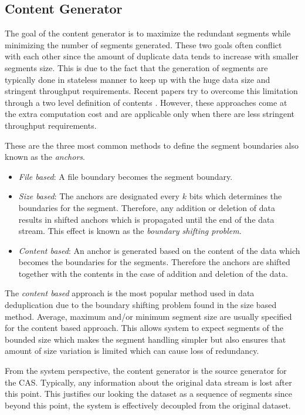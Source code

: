 \subsection{Content Generator}
The goal of the content generator is to maximize the redundant segments while minimizing the number of segments generated. These two goals often conflict with each other since the amount of duplicate data tends to increase with smaller segments size. This is due to the fact that the generation of segments are typically done in stateless manner to keep up with the huge data size and stringent throughput requirements. Recent papers try to overcome this limitation through a two level definition of contents \cite{kruus-bimodal, bobbarjung2006improving}. However, these approaches come at the extra computation cost and are applicable only when there are less stringent throughput requirements.

These are the three most common methods to define the segment boundaries also known as the \emph{anchors}\cite{Zhu:2008:ADB:1364813.1364831, Muthitacharoen:2001:LNF:502059.502052}.
\begin{itemize}
	\item \emph{File based}: A file boundary becomes the segment boundary.
	\item \emph{Size based}: The anchors are designated every $k$ bits which determines the boundaries for the segment. Therefore, any addition or deletion of data results in shifted anchors which is propagated until the end of the data stream. This effect is known as the \emph{boundary shifting problem}\cite{Muthitacharoen:2001:LNF:502059.502052}. 
	\item \emph{Content based}: An anchor is generated based on the content of the data which becomes the boundaries for the segments. Therefore the anchors are shifted together with the contents in the case of addition and deletion of the data. 
\end{itemize}

The \emph{content based} approach is the most popular method used in data deduplication due to the boundary shifting problem found in the size based method. 
Average, maximum and/or minimum segment size are usually specified for the content based approach. This allows system to expect segments of the bounded size which makes the segment handling simpler but also ensures that amount of size variation is limited which can cause loss of redundancy\cite{eshghi2005framework}.

From the system perspective, the content generator is the source generator for the CAS. Typically, any information about the original data stream is lost after this point. This justifies our looking the dataset as a sequence of segments since beyond this point, the system is effectively decoupled from the original dataset. 

